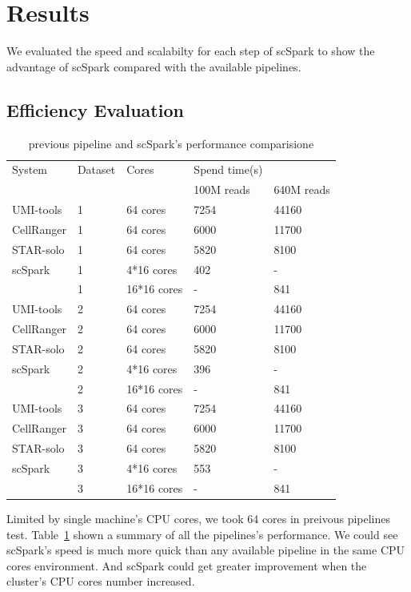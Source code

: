 \documentclass[10pt,journal,compsoc]{IEEEtran}
\begin{document}
\section{Results}
We evaluated the speed and scalabilty for each step of scSpark to show the advantage of scSpark compared with the available pipelines. 
\subsection{Efficiency Evaluation}
\begin{table}
	\centering
	\caption{previous pipeline and scSpark's performance comparisione}\label{tab1}
	\resizebox{0.45\textwidth}{!} {
	\begin{tabular}{l | l | l | l  l}
		\hline
		System & Dataset & Cores & Spend time(s) \\
		& & & 100M reads & 640M reads  \\
		\hline
		UMI-tools & 1 & 64 cores & 7254 & 44160 \\
		CellRanger & 1 & 64 cores & 6000 & 11700 \\
		STAR-solo & 1 & 64 cores &  5820 & 8100 \\
		scSpark & 1 & 4*16 cores & 402 & - \\
		& 1 & 16*16 cores & - & 841 \\
		UMI-tools & 2 & 64 cores & 7254 & 44160 \\
		CellRanger & 2 & 64 cores & 6000 & 11700 \\
		STAR-solo & 2 & 64 cores &  5820 & 8100 \\
		scSpark & 2 & 4*16 cores & 396 & - \\
		& 2 & 16*16 cores & - & 841 \\
		UMI-tools & 3 & 64 cores & 7254 & 44160 \\
		CellRanger & 3 & 64 cores & 6000 & 11700 \\
		STAR-solo & 3 & 64 cores &  5820 & 8100 \\
		scSpark & 3 & 4*16 cores & 553 & - \\
		& 3 & 16*16 cores & - & 841 \\
		\hline
	\end{tabular}
	}
\end{table}
Limited by single machine's CPU cores, we took 64 cores in preivous pipelines test.
Table~\ref{tab1} shown a summary of all the pipelines's performance.
We could see scSpark's speed is much more quick than any available pipeline in the same CPU cores environment.
And scSpark could get greater improvement when the cluster's CPU cores number increased.
\end{document}
